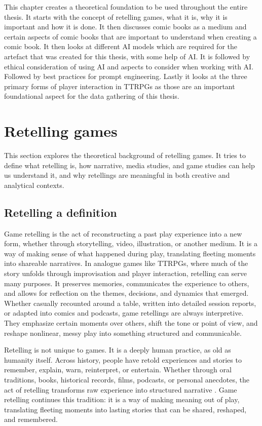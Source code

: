 This chapter creates a theoretical foundation to be used throughout the entire thesis. It starts with the concept of retelling games, what it is, why it is important and how it is done. It then discusses comic books as a medium and certain aspects of comic books that are important to understand when creating a comic book. It then looks at different AI models which are required for the artefact that was created for this thesis, with some help of AI. It is followed by ethical consideration of using AI and aspects to consider when working with AI. Followed by best practices for prompt engineering. Lastly it looks at the three primary forms of player interaction in TTRPGs as those are an important foundational aspect for the data gathering of this thesis.

\section{Retelling games}
This section explores the theoretical background of retelling games. It tries to define what retelling is, how narrative, media studies, and game studies can help us understand it, and why retellings are meaningful in both creative and analytical contexts.

\subsection*{Retelling a definition}
Game retelling is the act of reconstructing a past play experience into a new form, whether through storytelling, video, illustration, or another medium. It is a way of making sense of what happened during play, translating fleeting moments into shareable narratives. In analogue games like TTRPGs, where much of the story unfolds through improvisation and player interaction, retelling can serve many purposes. It preserves memories, communicates the experience to others, and allows for reflection on the themes, decisions, and dynamics that emerged. Whether casually recounted around a table, written into detailed session reports, or adapted into comics and podcasts, game retellings are always interpretive. They emphasize certain moments over others, shift the tone or point of view, and reshape nonlinear, messy play into something structured and communicable.

Retelling is not unique to games. It is a deeply human practice, as old as humanity itself. Across history, people have retold experiences and stories to remember, explain, warn, reinterpret, or entertain. Whether through oral traditions, books, historical records, films, podcasts, or personal anecdotes, the act of retelling transforms raw experience into structured narrative \cite{storr2019science}. Game retelling continues this tradition: it is a way of making meaning out of play, translating fleeting moments into lasting stories that can be shared, reshaped, and remembered.

